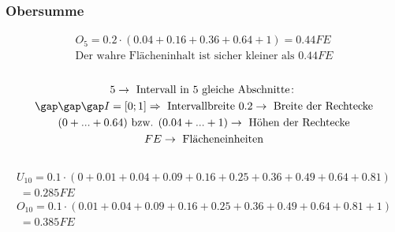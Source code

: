 \subsubsection{Obersumme}
\begin{gather*}
  O_5 = 0.2 \cdot (0.04 + 0.16 + 0.36 + 0.64 + 1) = 0.44FE \\
  \text{Der wahre Flächeninhalt ist sicher kleiner als } 0.44FE
\end{gather*} \\
\begin{gather*}
  5 \rightarrow \text{ Intervall in $5$ gleiche Abschnitte} \colon \\
  \gap\gap\gap I = \left[0; 1\right] \Rightarrow \text{ Intervallbreite } 0.2 \rightarrow \text{ Breite der Rechtecke} \\
  (0 + ... + 0.64) \text{ bzw. } (0.04 + ... + 1) \rightarrow \text{ Höhen der Rechtecke} \\
  FE \rightarrow \text{ Flächeneinheiten}
\end{gather*} \\
\begin{gather*}
  U_{10} = 0.1 \cdot (0 + 0.01 + 0.04 + 0.09 + 0.16 + 0.25 + 0.36 + 0.49 + 0.64 + 0.81) \\
  \;= 0.285FE \\
  O_{10} = 0.1 \cdot (0.01 + 0.04 + 0.09 + 0.16 + 0.25 + 0.36 + 0.49 + 0.64 + 0.81 + 1) \\
  \;= 0.385FE
\end{gather*}
\newpage
